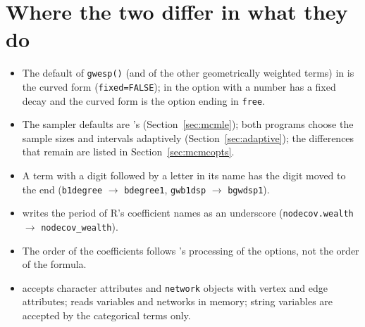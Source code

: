 \section*{Where the two differ in what they do}

\begin{itemize}[nosep]
  \item The default of \texttt{gwesp()} (and of the other geometrically weighted terms) in \ergm{} is the curved form (\texttt{fixed=FALSE}); in \nwergm{} the option with a number has a fixed decay and the curved form is the option ending in \texttt{free}.
  \item The sampler defaults are \ergm{}'s (Section~\ref{sec:mcmle}); both programs choose the sample sizes and intervals adaptively (Section~\ref{sec:adaptive}); the differences that remain are listed in Section~\ref{sec:mcmcopts}.
  \item A term with a digit followed by a letter in its name has the digit moved to the end (\texttt{b1degree} $\to$ \texttt{bdegree1}, \texttt{gwb1dsp} $\to$ \texttt{bgwdsp1}).
  \item \nwergm{} writes the period of R's coefficient names as an underscore (\texttt{nodecov.wealth} $\to$ \texttt{nodecov\_wealth}).
  \item The order of the coefficients follows \nwergm{}'s processing of the options, not the order of the formula.
  \item \ergm{} accepts character attributes and \texttt{network} objects with vertex and edge attributes; \nwergm{} reads variables and networks in memory; string variables are accepted by the categorical terms only.
\end{itemize}
